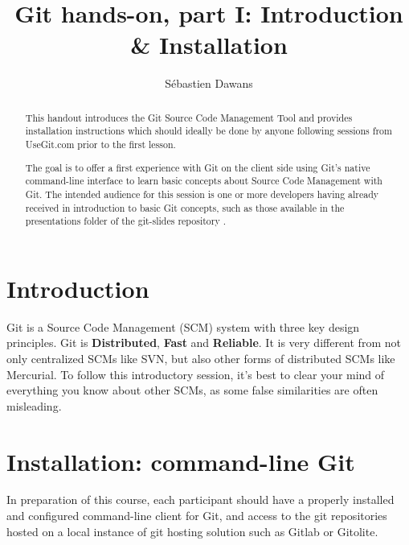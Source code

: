 \documentclass[a4paper]{../../common/tufte-latex/tufte-handout}
\title{Git hands-on, part I: Introduction \& Installation}
\author{S\'ebastien Dawans}
\begin{document}
\maketitle%

\tableofcontents

\begin{abstract}
\noindent
This handout introduces the Git Source Code Management Tool and provides installation instructions which should ideally be done by anyone following sessions from UseGit.com  prior to the first lesson.

The goal is to offer a first experience with Git on the client side using Git's native command-line interface to learn basic concepts about Source Code Management with Git.
The intended audience for this session is one or more developers having already received in introduction to basic Git concepts, such as those available in the presentations folder of the git-slides repository .

\end{abstract}


\section{Introduction}\label{sec:intro}

Git is a Source Code Management (SCM) system with three key design principles.
Git is \textbf{Distributed}, \textbf{Fast} and \textbf{Reliable}.
It is very different from not only centralized SCMs like SVN, but also other forms of distributed SCMs like Mercurial.
To follow this introductory session, it's best to clear your mind of everything you know about other SCMs, as some false similarities are often misleading.

\section{Installation: command-line Git}

In preparation of this course, each participant should have a properly installed and configured command-line client for Git, and access to the git repositories hosted on a local instance of git hosting solution such as Gitlab or Gitolite.
\end{document}
